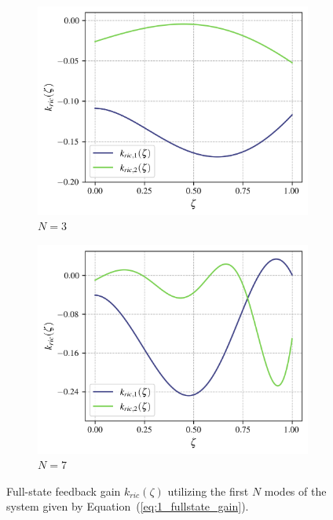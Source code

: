 \begin{figure}[!htbp]
    \centering
    \begin{subfigure}[b]{0.48\textwidth}
        \centering
        \includegraphics[width=\textwidth]{papers/1_optimal/figures/k_3.png}
        \caption{$N = 3$}
        \label{fig:1_k_3}
    \end{subfigure}
    \hfill
    \begin{subfigure}[b]{0.48\textwidth}
        \centering
        \includegraphics[width=\textwidth]{papers/1_optimal/figures/k_7.png}
        \caption{$N = 7$}
        \label{fig:1_k_7}
    \end{subfigure}
    \caption{Full-state feedback gain $k_{ric}(\zeta)$ utilizing the first $N$ modes of the system given by Equation~(\ref{eq:1_fullstate_gain}).}
    \label{fig:1_k_modes}
\end{figure}


